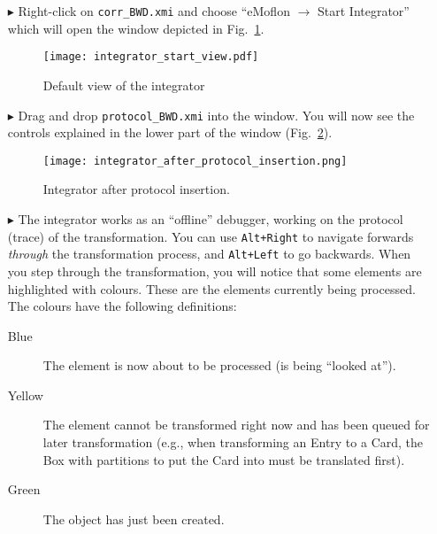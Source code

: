 \begin{itemize}

\item[$\blacktriangleright$] Right-click on \texttt{corr\_BWD.xmi} and choose ``eMoflon $\rightarrow$ Start Integrator'' which will open the window depicted in
Fig.~\ref{fig:integrator_start}.

\vspace{0.5cm}

\begin{figure}[htbp]
\begin{center}
  \texttt{[image: integrator\_start\_view.pdf]}
  \caption{Default view of the integrator}
  \label{fig:integrator_start}
\end{center}
\end{figure}

\item[$\blacktriangleright$] Drag and drop \texttt{protocol\_BWD.xmi} into the window. You will now see the controls explained in the lower part of the window 
(Fig.~\ref{fig:integrator_after_protocol}).

\begin{figure}[h!]
\begin{center}
  \texttt{[image: integrator\_after\_protocol\_insertion.png]}
  \caption{Integrator after protocol insertion.}
  \label{fig:integrator_after_protocol}
\end{center}
\end{figure} 
\FloatBarrier

\item[$\blacktriangleright$] The integrator works as an ``offline'' debugger, working on the protocol (trace) of the transformation. You can use
\texttt{Alt+Right} to navigate forwards \emph{through} the transformation process, and \texttt{Alt+Left} to go backwards.  When you step through the
transformation, you will notice that some elements are highlighted with colours. These are the elements currently being processed. The colours have the
following definitions:
\begin{description}
  \item[Blue] The element is now about to be processed (is being ``looked at'').
  \vspace{0.5cm}
  \item[Yellow] The element cannot be transformed right now and has been queued for later transformation 
  (e.g., when transforming an Entry to a Card, the Box with partitions to put the 
  Card into must be translated first).
  \vspace{0.5cm}
  \item[Green] The object has just been created.
\end{description}

\end{itemize}
